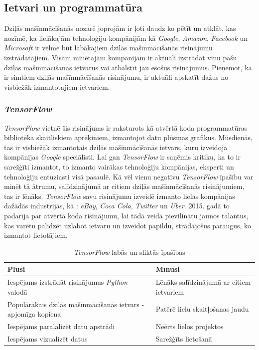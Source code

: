 \subsection{Ietvari un programmatūra}
Dziļās mašīnmācīšanās nozarē joprojām ir ļoti daudz ko pētīt un atklāt, kas nozīmē, ka lielākajām tehnoloģiju kompānijām kā \textit{Google}, \textit{Amazon}, \textit{Facebook} un \textit{Microsoft} ir vēlme būt labākajiem dziļās mašīnmācīšanās risinājumu izstrādātājiem. Visām minētajām kompānijām ir aktuāli izstrādāt viņu pašu dziļās mašīnmācīšanās ietvarus vai atbalstīt jau esošus risinājumus. Pieņemot, ka ir simtiem dziļās mašīnmācīšanās risinājumu, ir aktuāli apskatīt dažus no visbiežāk izmantotajiem ietvariem.

\subsubsection{\textit{TensorFlow}}

\textit{TensorFlow} vietnē \cite{tensor1} šis risinājums ir raksturots kā atvērtā koda programmatūras bibliotēka skaitliskiem aprēķiniem, izmantojot datu plūsmas grafikus. Mūsdienās, tas ir visbiežāk izmantotais dziļās mašīnmācīšanās ietvars, kuru izveidoja kompānijas \textit{Google} speciālisti. Lai gan \textit{TensorFlow} ir saņēmis kritiku, ka to ir sarežģīti izmantot, to izmanto vairākas tehnoloģiju kompānijas, eksperti un tehnoloģiju entuziasti visā pasaulē. Kā vēl vienu negatīvu \textit{TensorFlow} īpašību var minēt tā ātrumu, salīdzinājumā ar citiem dziļās mašīnmācīšanās risinājumiem, tas ir \cite{tensor2} lēnāks. \textit{TensorFlow} savu risinājumu izveidē izmanto lielas kompānijas dažādās industrijās, kā : \textit{eBay}, \textit{Coca Cola}, \textit{Twitter} un \textit{Uber}. 2015. gadā to padarīja par atvērtā koda risinājumu, lai tādā veidā pievilinātu jaunos talantus, kas varētu palīdzēt uzlabot ietvaru un izveidot papildu, strādājošus paraugus, ko izmantot lietotājiem. 

	\begin{table}[ht!]	
	\centering
	\begin{tabular}{ |p{7cm}|p{7cm}| }
		\hline
		\textbf{Plusi} & \textbf{Mīnusi}\\ \hline
		Iespējams izstrādāt risinājumus \textit{Python} valodā & Lēnāks salīdzinājumā ar citiem ietvariem \\ \hline 
		Populārākais dziļās mašīnmācīšanās ietvars - apjomīga kopiena & Patērē lielu skaitļošanas jaudu \\ \hline
		Iespējams paralalizēt datu apstrādi  & Neērts lielos projektos \\  \hline
		Iespējams vizualizēt datus & Sarežģīts lietošanā\\ \hline
	\end{tabular}
\caption{\textit{TensorFlow} labās un sliktās īpašības}
\end{table}


